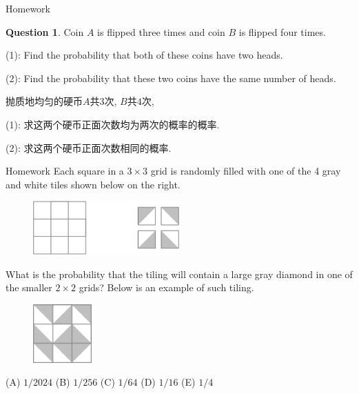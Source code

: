 \documentclass{beamer}
\theoremstyle{definition}
\newtheorem{ques}[defn]{Question}
\begin{document}
\begin{frame}{Homework}
    \begin{ques}
        Coin $A$ is flipped three times and coin $B$ is flipped four times.

        (1): Find the probability that both of these coins have two heads.

        (2): Find the probability that these two coins have the same number of heads.

        抛质地均匀的硬币$A$共$3$次, $B$共$4$次,

        (1): 求这两个硬币正面次数均为两次的概率的概率.

        (2): 求这两个硬币正面次数相同的概率.
    \end{ques}
\end{frame}
\begin{frame}{Homework}
    Each square in a $3 \times 3$ grid is randomly filled with one of the 4 gray and white tiles shown below on the right.
\begin{figure}
    \centering
    \includegraphics[width=0.5\textwidth]{grid.png}
\end{figure}
What is the probability that the tiling will contain a large gray diamond in one of the smaller $2 \times 2$ grids? Below is an example of such tiling.
\begin{figure}
    \centering
    \includegraphics[width=0.2\textwidth]{grid2.png}
\end{figure}
\end{frame}
(A) $1/2024$ (B) $1/256$ (C) $1/64$ (D) $1/16$ (E) $1/4$
\end{document}

